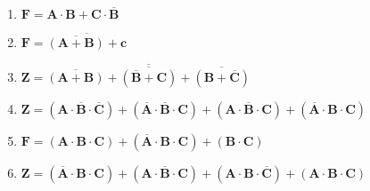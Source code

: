 \documentclass[12pt]{article}
\begin{document}
\begin{enumerate}[label = \textbf{\alph*.}]
\begin{enumerate}[label = \textbf{\arabic*.}]
                    \item $\mathbf{F = A \cdot B + C \cdot \overline{B}}$
                    
                    \item $\mathbf{F = \overline{\overline{(A + B)} + c}}$
                    
                    \item $\mathbf{Z = \overline{\overline{(A + B)} + \overline{(\overline{B} + C)} + \overline{(B + \overline{C})}}}$
                    
                    \item $\mathbf{Z = (A \cdot \overline{B} \cdot \overline{C}) + (\overline{A} \cdot \overline{B} \cdot C) + (A \cdot \overline{B} \cdot C) + (\overline{A} \cdot B \cdot C)}$
                    
                    \item $\mathbf{F = (A \cdot B \cdot C) + (\overline{A} \cdot B \cdot C) + (B \cdot C)}$
                    
                    \item $\mathbf{Z = (\overline{A} \cdot B \cdot C) + (A \cdot \overline{B} \cdot C) + (A \cdot B \cdot \overline{C}) + (A \cdot B \cdot C)}$
                \end{enumerate}

        \end{enumerate}
\end{document}
